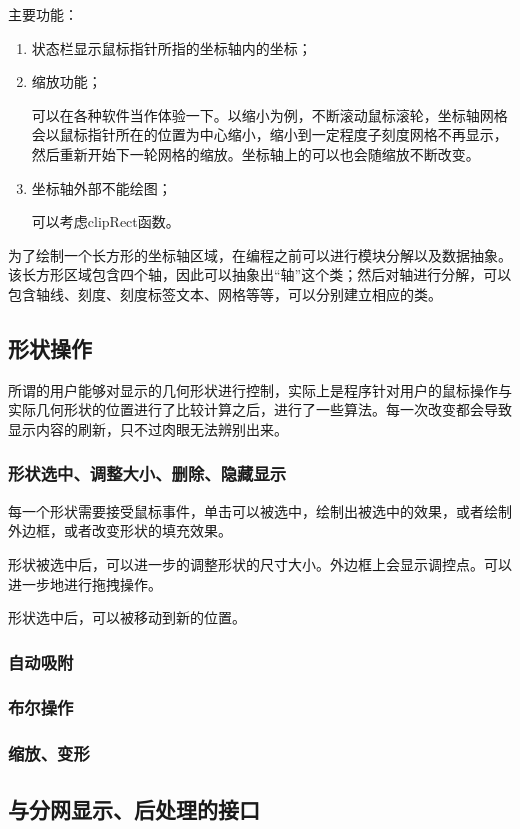 主要功能：
\begin{enumerate}
	\item 状态栏显示鼠标指针所指的坐标轴内的坐标；
	\item 缩放功能；
	
\hspace*{2em} 可以在各种软件当作体验一下。以缩小为例，不断滚动鼠标滚轮，坐标轴网格会以鼠标指针所在的位置为中心缩小，缩小到一定程度子刻度网格不再显示，然后重新开始下一轮网格的缩放。坐标轴上的可以也会随缩放不断改变。
	\item 坐标轴外部不能绘图；

\hspace*{2em} 可以考虑clipRect函数。
\end{enumerate}

为了绘制一个长方形的坐标轴区域，在编程之前可以进行模块分解以及数据抽象。该长方形区域包含四个轴，因此可以抽象出“轴”这个类；然后对轴进行分解，可以包含轴线、刻度、刻度标签文本、网格等等，可以分别建立相应的类。
\subsection{形状操作}
所谓的用户能够对显示的几何形状进行控制，实际上是程序针对用户的鼠标操作与实际几何形状的位置进行了比较计算之后，进行了一些算法。每一次改变都会导致显示内容的刷新，只不过肉眼无法辨别出来。
\subsubsection{形状选中、调整大小、删除、隐藏显示}
每一个形状需要接受鼠标事件，单击可以被选中，绘制出被选中的效果，或者绘制外边框，或者改变形状的填充效果。

形状被选中后，可以进一步的调整形状的尺寸大小。外边框上会显示调控点。可以进一步地进行拖拽操作。

形状选中后，可以被移动到新的位置。
\subsubsection{自动吸附}

\subsubsection{布尔操作}

\subsubsection{缩放、变形}

\subsection{与分网显示、后处理的接口}

